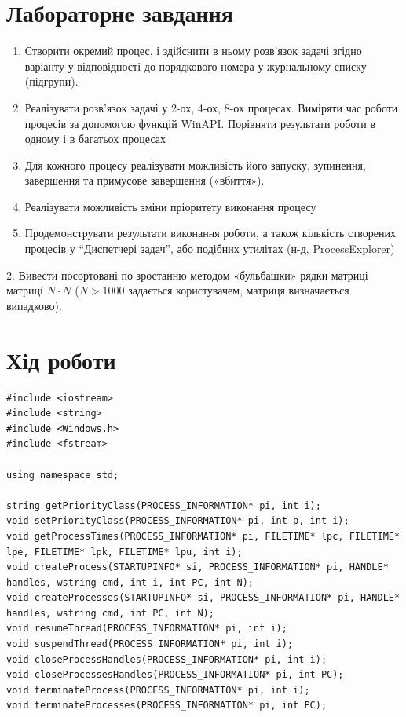 \documentclass{article}
\begin{document}
\begin{normalsize}
	\section*{Лабораторне завдання}
	\begin{enumerate}
		\item Створити окремий процес, і здійснити в ньому розв’язок задачі
		згідно варіанту у відповідності до порядкового номера у
		журнальному списку (підгрупи).
		\item Реалізувати розв’язок задачі у 2-ох, 4-ох, 8-ох процесах. Виміряти
		час роботи процесів за допомогою функцій WinAPI. Порівняти
		результати роботи в одному і в багатьох процесах
		\item Для кожного процесу реалізувати можливість його запуску,
		зупинення, завершення та примусове завершення («вбиття»).
		\item Реалізувати можливість зміни пріоритету виконання процесу
		\item Продемонструвати результати виконання роботи, а також кількість
		створених процесів у “Диспетчері задач”, або подібних утилітах (н-д,
		ProcessExplorer)
	\end{enumerate}
	\begin{center}
		2. Вивести посортовані по зростанню методом «бульбашки» рядки
		матриці матриці $N\cdot N$ ($N>1000$ задається користувачем, матриця
		визначається випадково).
	\end{center}

	\section*{Хід роботи}	
	\begin{lstlisting}                 
#include <iostream>
#include <string>
#include <Windows.h>
#include <fstream>

using namespace std;

string getPriorityClass(PROCESS_INFORMATION* pi, int i);
void setPriorityClass(PROCESS_INFORMATION* pi, int p, int i);
void getProcessTimes(PROCESS_INFORMATION* pi, FILETIME* lpc, FILETIME* lpe, FILETIME* lpk, FILETIME* lpu, int i);
void createProcess(STARTUPINFO* si, PROCESS_INFORMATION* pi, HANDLE* handles, wstring cmd, int i, int PC, int N);
void createProcesses(STARTUPINFO* si, PROCESS_INFORMATION* pi, HANDLE* handles, wstring cmd, int PC, int N);
void resumeThread(PROCESS_INFORMATION* pi, int i);
void suspendThread(PROCESS_INFORMATION* pi, int i);
void closeProcessHandles(PROCESS_INFORMATION* pi, int i);
void closeProcessesHandles(PROCESS_INFORMATION* pi, int PC);
void terminateProcess(PROCESS_INFORMATION* pi, int i);
void terminateProcesses(PROCESS_INFORMATION* pi, int PC);


\end{lstlisting}
\end{normalsize}
\end{document}
